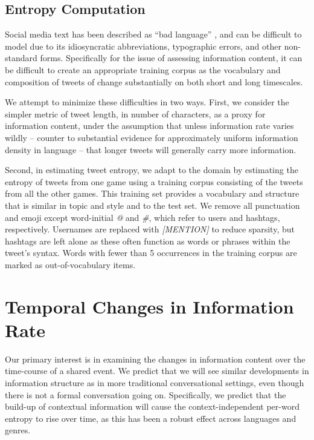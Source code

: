 \documentclass[11pt,letterpaper]{article}
\begin{document}
\subsection{Entropy Computation}
Social media text has been described as ``bad language'' \cite{eisenstein2013}, and can be difficult to model due to its idiosyncratic abbreviations, typographic errors, and other non-standard forms. Specifically for the issue of assessing information content, it can be difficult to create an appropriate training corpus as the vocabulary and composition of tweets of change substantially on both short and long timescales. \cite{eisenstein2013}

We attempt to minimize these difficulties in two ways.  First, we consider the simpler metric of tweet length, in number of characters, as a proxy for information content, under the assumption that unless information rate varies wildly -- counter to substantial evidence for approximately uniform information density in language -- that longer tweets will generally carry more information.

Second, in estimating tweet entropy, we adapt to the domain by estimating the entropy of tweets from one game using a training corpus consisting of the tweets from all the other games. This training set provides a vocabulary and structure that is similar in topic and style and to the test set.  We remove all punctuation and emoji except word-initial {\it @} and {\it \#}, which refer to users and hashtags, respectively.  Usernames are replaced with {\it [MENTION]} to reduce sparsity, but hashtags are left alone as these often function as words or phrases within the tweet's syntax.  Words with fewer than 5 occurrences in the training corpus are marked as out-of-vocabulary items.

\section{Temporal Changes in Information Rate}

Our primary interest is in examining the changes in information content over the time-course of a shared event.  We predict that we will see similar developments in information structure as in more traditional conversational settings, even though there is not a formal conversation going on.  Specifically, we predict that the build-up of contextual information will cause the context-independent per-word entropy to rise over time, as this has been a robust effect across languages and genres. \cite{genzel2002,genzel2003,qian2012}
\end{document}
